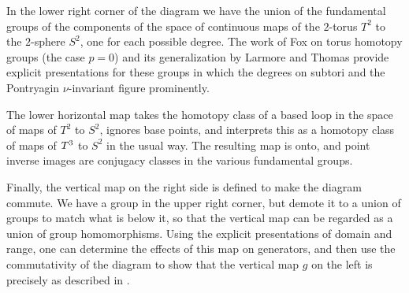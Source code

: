 In the lower right corner of the diagram we have the union of the fundamental groups of the components of the space of continuous maps of the $2$-torus $T^2$ to the $2$-sphere $S^2$, one for each possible degree.  The work of Fox \cite{Fox} on torus homotopy groups (the case $p = 0$) and its generalization by Larmore and Thomas \cite{LarmoreThomas} provide explicit presentations for these groups in which the degrees on subtori and the Pontryagin $\nu$-invariant figure prominently. 
 
The lower horizontal map takes the homotopy class of a based loop in the space of maps of $T^2$ to $S^2$, ignores base points, and interprets this as a homotopy class of maps of $T^3$ to $S^2$ in the usual way.  The resulting map is onto, and point inverse images are conjugacy classes in the various fundamental groups.
 
Finally, the vertical map on the right side is defined to make the diagram commute.  We have a group in the upper right corner, but demote it to a union of groups to match what is below it, so that the vertical map can be regarded as a union of group homomorphisms.  Using the explicit presentations of domain and range, one can determine the effects of this map on generators, and then use the commutativity of the diagram to show that the vertical map $g$ on the left is precisely as described in . 
 
